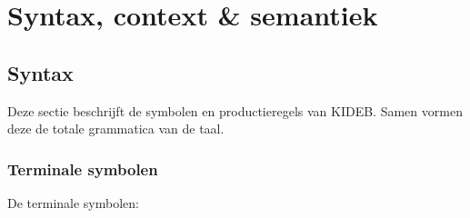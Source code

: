 \chapter{Syntax, context \& semantiek}
    \label{chap:syntax_context_en_semantiek}
\section{Syntax}
Deze sectie beschrijft de symbolen en productieregels van KIDEB. Samen vormen deze de totale grammatica van de taal.
\subsection{Terminale symbolen}
De terminale symbolen:
\begin{description}
    \item \itab{:}\stab{;}\stab{(}\stab{)}\stab{[}
    \item \itab{]}\stab{\{}\stab{\}}\stab{,}\stab{\textbackslash}
    \item {}\stab{+}\stab{-}\stab{/}\stab{\textless}
    \item \itab{\^}\stab{=}\stab{\textless}\stab{\textgreater}\stab{\textgreater =}
    \item \itab{!}\stab{\textless =}\stab{==}\stab{\textbar \textbar}\stab{\&\&}
    \item {}
    \item {}
    \item {}
    \item {}
    \item {}
\end{description}
\clearpage

